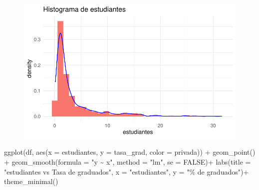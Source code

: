 \documentclass[
  letterpaper,
  DIV=11,
  numbers=noendperiod]{scrartcl}
\newenvironment{Shaded}{\begin{snugshade}}{\end{snugshade}}
\newcommand{\AttributeTok}[1]{\textcolor[rgb]{0.40,0.45,0.13}{#1}}
\newcommand{\ConstantTok}[1]{\textcolor[rgb]{0.56,0.35,0.01}{#1}}
\newcommand{\FunctionTok}[1]{\textcolor[rgb]{0.28,0.35,0.67}{#1}}
\newcommand{\NormalTok}[1]{\textcolor[rgb]{0.00,0.23,0.31}{#1}}
\newcommand{\SpecialCharTok}[1]{\textcolor[rgb]{0.37,0.37,0.37}{#1}}
\newcommand{\StringTok}[1]{\textcolor[rgb]{0.13,0.47,0.30}{#1}}
\begin{document}
\begin{figure}[H]

{\centering \includegraphics{TP_final_files/figure-pdf/unnamed-chunk-13-1.pdf}

}

\end{figure}

\begin{Shaded}
\begin{Highlighting}[]
\FunctionTok{ggplot}\NormalTok{(df, }\FunctionTok{aes}\NormalTok{(}\AttributeTok{x =}\NormalTok{ estudiantes, }\AttributeTok{y =}\NormalTok{ tasa\_grad, }\AttributeTok{color =}\NormalTok{ privada)) }\SpecialCharTok{+}
  \FunctionTok{geom\_point}\NormalTok{() }\SpecialCharTok{+} 
  \FunctionTok{geom\_smooth}\NormalTok{(}\AttributeTok{formula =} \StringTok{"y \textasciitilde{} x"}\NormalTok{, }\AttributeTok{method =} \StringTok{"lm"}\NormalTok{, }\AttributeTok{se =} \ConstantTok{FALSE}\NormalTok{)}\SpecialCharTok{+}
  \FunctionTok{labs}\NormalTok{(}\AttributeTok{title =} \StringTok{"estudiantes vs Tasa de graduados"}\NormalTok{,}
       \AttributeTok{x =} \StringTok{"estudiantes"}\NormalTok{,}
       \AttributeTok{y =} \StringTok{"\% de graduados"}\NormalTok{)}\SpecialCharTok{+}
  \FunctionTok{theme\_minimal}\NormalTok{()}
\end{Highlighting}
\end{Shaded}
\end{document}
